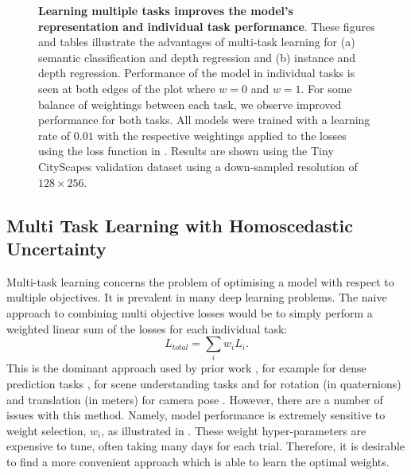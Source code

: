 \begin{figure}[t]
   \caption[Effect of varying task weights for multitask learning.]{\textbf{Learning multiple tasks improves the model's representation and individual task performance}. These figures and tables illustrate the advantages of multi-task learning for (a) semantic classification and depth regression and (b) instance and depth regression. Performance of the model in individual tasks is seen at both edges of the plot where $w=0$ and $w=1$. For some balance of weightings between each task, we observe improved performance for both tasks. All models were trained with a learning rate of $0.01$ with the respective weightings applied to the losses using the loss function in . Results are shown using the Tiny CityScapes validation dataset using a down-sampled resolution of $128\times256$.}
\label{fig:scale_factor}
\end{figure}

\subsection{Multi Task Learning with Homoscedastic Uncertainty}
\label{sec:multitask}

Multi-task learning concerns the problem of optimising a model with respect to multiple objectives. It is prevalent in many deep learning problems. The naive approach to combining multi objective losses would be to simply perform a weighted linear sum of the losses for each individual task:
\begin{equation}
\label{eqn:basic_loss}
L_{total}= \sum_i w_i L_{i}.
\end{equation}
This is the dominant approach used by prior work \citep{teichmann2016multinet,sermanet2013overfeat,liao2016understand,uhrig2016pixel}, for example for dense prediction tasks \citep{kokkinos2016ubernet}, for scene understanding tasks \citep{eigen2015predicting} and for rotation (in quaternions) and translation (in meters) for camera pose \citep{kendall2015posenet}. However, there are a number of issues with this method. Namely, model performance is extremely sensitive to weight selection, $w_i$, as illustrated in . These weight hyper-parameters are expensive to tune, often taking many days for each trial. Therefore, it is desirable to find a more convenient approach which is able to learn the optimal weights.

